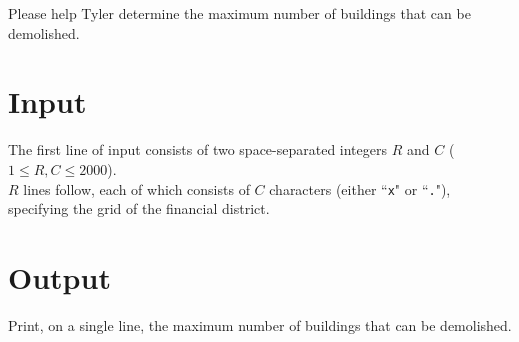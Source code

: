 Please help Tyler determine the maximum number of buildings that can be demolished.

\section*{Input}
The first line of input consists of two space-separated integers $R$ and $C$ ($1 \le R, C \le 2000$).\\
$R$ lines follow, each of which consists of $C$ characters (either ``\texttt{x}" or ``\texttt{.}"), specifying the grid of the financial district.

\section*{Output}
Print, on a single line, the maximum number of buildings that can be demolished.
